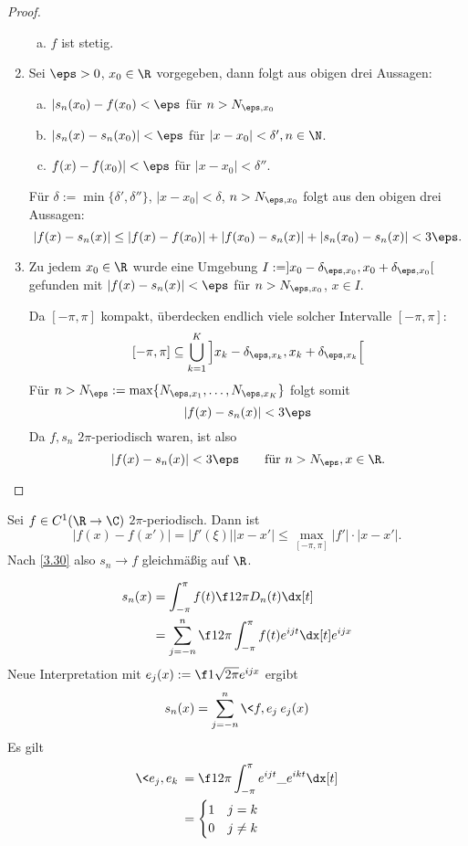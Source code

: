 \begin{st}
\begin{proof}
\begin{enumerate}[1]
\begin{enumerate}[a)]
					\item
						$f$ ist stetig.
				\end{enumerate}
			\item
				Sei $\eps > 0$, $x_0 \in \R$ vorgegeben, dann folgt aus obigen drei Aussagen:
				\begin{enumerate}[a)]
					\item
						$|s_n(x_0) - f(x_0) < \eps$ für $n > N_{\eps, x_0}$
					\item
						$|s_n(x) - s_n(x_0)| < \eps$ für $|x-x_0| < \delta', n\in \N$.
					\item
						$f(x) - f(x_0)| < \eps$ für $|x-x_0| < \delta''$.
				\end{enumerate}
				Für $\delta := \min\{\delta', \delta''\}$, $|x-x_0| < \delta$, $n > N_{\eps, x_0}$ folgt aus den obigen drei Aussagen:
				\[
					|f(x) - s_n(x)| 
					\le |f(x) - f(x_0)| + |f(x_0)-s_n(x)| + |s_n(x_0) - s_n(x)|
					< 3\eps.
				\]
			\item
				Zu jedem $x_0 \in \R$ wurde eine Umgebung $I := ]x_0-\delta_{\eps, x_0}, x_0 + \delta_{\eps, x_0}[$ gefunden mit $|f(x) - s_n(x)| < \eps$ für $n > N_{\eps, x_0}$, $x \in  I$.

				Da $[-\pi,\pi]$ kompakt, überdecken endlich viele solcher Intervalle $[-\pi, \pi]$:
				\[
					[-\pi,\pi] \subset \bigcup_{k=1}^K \Big] x_k - \delta_{\eps, x_k}, x_k + \delta_{\eps, x_k} \Big[
				\]
				Für $n > N_\eps := \max\{N_{\eps, x_1}, \dotsc, N_{\eps, x_K}\}$ folgt somit
				\[
					|f(x) - s_n(x)| < 3\eps
				\]
				Da $f, s_n$ $2\pi$-periodisch waren, ist also
				\[
					|f(x) - s_n(x)| < 3\eps \qquad \text{für $n> N_\eps, x\in \R$.}
				\]
		\end{enumerate}
	\end{proof}
\end{st}

\begin{nt} \label{3.31}
	Sei $f \in C^1(\R \to \C)$ $2\pi$-periodisch.
	Dann ist
	\[
		|f(x) - f(x')| = |f'(\xi)||x-x'| \le \max_{[-\pi,\pi]} |f'|\cdot |x-x'|.
	\]
	Nach \ref{3.30} also $s_n \to f$ gleichmäßig auf $\R$.
\end{nt}

\begin{st} \label{3.32}
	\begin{align*}
		s_n(x) 
		&= \int_{-\pi}^{\pi} f(t) \f 1{2\pi} D_n(t) \dx[t] \\
		&= \sum_{j=-n}^n \f 1{2\pi} \int_{-\pi}^\pi f(t) e^{ijt} \dx[t] e^{ijx}
	\end{align*}
	Neue Interpretation mit $e_j(x) := \f 1{\sqrt{2\pi}} e^{ijx}$ ergibt
	\[
		s_n(x) = \sum_{j=-n}^n \<f,e_j\> e_j(x)
	\]
	Es gilt
	\begin{align*}
		\<e_j, e_k\> &= \f 1{2\pi} \int_{-\pi}^\pi e^{ijt}\_{e^{ikt}} \dx[t] \\
		&= \begin{cases}
			1 & j=k \\
			0 & j\neq k
		\end{cases}
	\end{align*}
\end{st}

